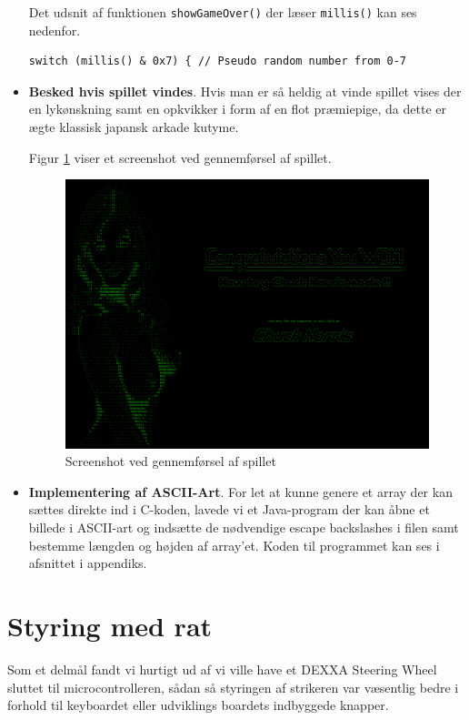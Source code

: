 \begin{itemize}
Det udsnit af funktionen \texttt{showGameOver()} der læser \texttt{millis()} kan ses nedenfor.

\begin{lstlisting}[frame=single,firstnumber=6]
switch (millis() & 0x7) { // Pseudo random number from 0-7
\end{lstlisting}

\item \textbf{Besked hvis spillet vindes}. Hvis man er så heldig at vinde spillet vises der en lykønskning samt en opkvikker i form af en flot præmiepige, da dette er ægte klassisk japansk arkade kutyme.

Figur \ref{fig:won_normal} viser et screenshot ved gennemførsel af spillet.

\begin{figure}[h!]
\centering
\includegraphics[scale=0.25]{figs/screenshots/won_normal.png}
\caption{Screenshot ved gennemførsel af spillet}
\label{fig:won_normal}
\end{figure}

\item \textbf{Implementering af ASCII-Art}. For let at kunne genere et array der kan sættes direkte ind i C-koden, lavede vi et Java-program der kan åbne et billede i ASCII-art og indsætte de nødvendige escape backslashes i filen samt bestemme længden og højden af array'et. Koden til programmet kan ses i afsnittet  i appendiks.

\end{itemize}

\section{Styring med rat}
Som et delmål fandt vi hurtigt ud af vi ville have et DEXXA Steering Wheel sluttet til microcontrolleren, sådan så styringen af strikeren var væsentlig bedre i forhold til keyboardet eller udviklings boardets indbyggede knapper.

